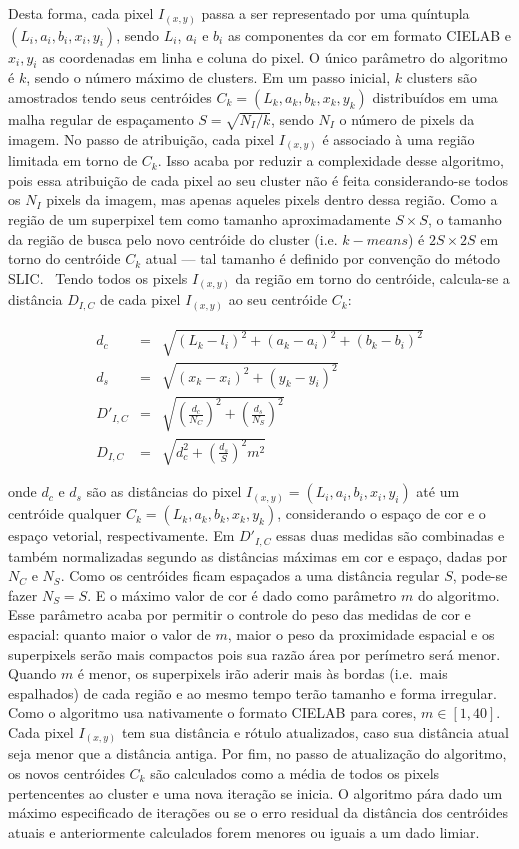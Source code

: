 Desta forma, cada pixel $I_{(x,y)}$ passa a ser representado por uma
quíntupla $(L_i, a_i, b_i, x_i, y_i)$, sendo $L_i$, $a_i$ e $b_i$ as
componentes da cor em formato CIELAB e $x_i, y_i$ as coordenadas em
linha e coluna do pixel. O único parâmetro do algoritmo é $k$, sendo o
número máximo de clusters. Em um passo inicial, $k$ clusters são
amostrados tendo seus centróides $C_k = (L_k, a_k, b_k, x_k, y_k)$
distribuídos em uma malha regular de espaçamento $S = \sqrt{N_I/k}$,
sendo $N_I$ o número de pixels da imagem. No passo de atribuição, cada
pixel $I_{(x,y)}$ é associado à uma região limitada em torno de
$C_k$. Isso acaba por reduzir a complexidade desse algoritmo, pois
essa atribuição de cada pixel ao seu cluster não é feita
considerando-se todos os $N_I$ pixels da imagem, mas apenas aqueles
pixels dentro dessa região. Como a região de um superpixel tem como
tamanho aproximadamente $S \times S$, o tamanho da região de busca
pelo novo centróide do cluster (i.e. $k-means$) é $2S \times 2S$ em
torno do centróide $C_k$ atual --- tal tamanho é definido por
convenção do método SLIC.~\cite{slic} Tendo todos os pixels
$I_{(x,y)}$ da região em torno do centróide, calcula-se a distância
$D_{I,C}$ de cada pixel $I_{(x,y)}$ ao seu centróide $C_k$:

\begin{eqnarray}
  d_c      & = & \sqrt{(L_k - l_i)^2 + (a_k - a_i)^2 + (b_k - b_i)^2} \\
  d_s      & = & \sqrt{(x_k - x_i)^2 + (y_k - y_i)^2} \\
  D'_{I,C}  & = & \sqrt{(\frac{d_c}{N_C})^2 + (\frac{d_s}{N_S})^2} \\
  D_{I,C}   & = & \sqrt{d_c^2 + (\frac{d_s}{S})^2 m^2}
\end{eqnarray}

\noindent onde $d_c$ e $d_s$ são as distâncias do pixel $I_{(x,y)} =
(L_i, a_i, b_i, x_i, y_i)$ até um centróide qualquer $C_k = (L_k, a_k,
b_k, x_k, y_k)$, considerando o espaço de cor e o espaço vetorial,
respectivamente. Em $D'_{I,C}$ essas duas medidas são combinadas e
também normalizadas segundo as distâncias máximas em cor e espaço,
dadas por $N_C$ e $N_S$. Como os centróides ficam espaçados a uma
distância regular $S$, pode-se fazer $N_S = S$. E o máximo valor de
cor é dado como parâmetro $m$ do algoritmo. Esse parâmetro acaba por
permitir o controle do peso das medidas de cor e espacial: quanto
maior o valor de $m$, maior o peso da proximidade espacial e os
superpixels serão mais compactos pois sua razão área por perímetro
será menor. Quando $m$ é menor, os superpixels irão aderir mais às
bordas (i.e.\ mais espalhados) de cada região e ao mesmo tempo terão
tamanho e forma irregular. Como o algoritmo usa nativamente o formato
CIELAB para cores, $m \in [1, 40]$. Cada pixel $I_{(x,y)}$ tem sua
distância e rótulo atualizados, caso sua distância atual seja menor
que a distância antiga. Por fim, no passo de atualização do algoritmo,
os novos centróides $C_k$ são calculados como a média de todos os
pixels pertencentes ao cluster e uma nova iteração se inicia. O
algoritmo pára dado um máximo especificado de iterações ou se o erro
residual da distância dos centróides atuais e anteriormente calculados
forem menores ou iguais a um dado limiar.

